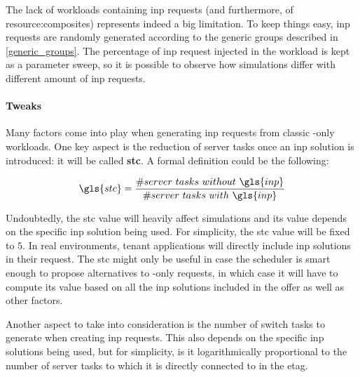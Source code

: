 The lack of workloads containing \gls{inp} requests (and furthermore, of \glspl{resource:composite}) represents indeed a big limitation.
To keep things easy, \gls{inp} requests are randomly generated according to the generic groups described in \autoref{generic_groups}.
The percentage of \gls{inp} request injected in the workload is kept as a parameter sweep, so it is possible to observe how simulations differ with different amount of \gls{inp} requests.

\paragraph{Tweaks} \label{workload_tweaks}
Many factors come into play when generating \gls{inp} requests from classic -only workloads.
One key aspect is the reduction of server tasks once an \gls{inp} solution is introduced: it will be called \textbf{\gls{stc}}.
A formal definition could be the following:

\begin{equation}
\label{stc_formula}
\gls{stc}=\dfrac{\#server\ tasks\ without\ \gls{inp}}{\#server\ tasks\ with\ \gls{inp}}
\end{equation}

Undoubtedly, the \gls{stc} value will heavily affect simulations and its value depends on the specific \gls{inp} solution being used.
For simplicity, the \gls{stc} value will be fixed to $5$. %
In real environments, tenant applications will directly include \gls{inp} solutions in their request.
The \gls{stc} might only be useful in case the scheduler is smart enough to propose alternatives to -only requests, in which case it will have to compute its value based on all the \gls{inp} solutions included in the offer as well as other factors.

Another aspect to take into consideration is the number of switch tasks to generate when creating \gls{inp} requests.
This also depends on the specific \gls{inp} solutions being used, but for simplicity, is it logarithmically proportional to the number of server tasks to which it is directly connected to in the \gls{etag}. %

